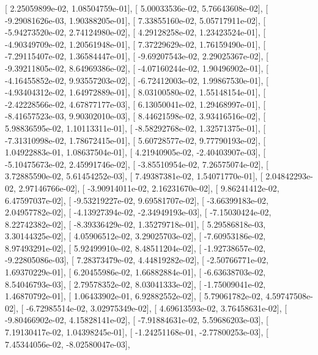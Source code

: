 \documentclass{article}
\begin{document}
       [  2.25059899e-02,   1.08504759e-01],
       [  5.00033536e-02,   5.76643608e-02],
       [ -9.29081626e-03,   1.90388205e-01],
       [  7.33855160e-02,   5.05717911e-02],
       [ -5.94273520e-02,   2.74124980e-02],
       [  4.29128258e-02,   1.23423524e-01],
       [ -4.90349709e-02,   1.20561948e-01],
       [  7.37229629e-02,   1.76159490e-01],
       [ -7.29115407e-02,   1.36584447e-01],
       [ -9.69207543e-02,   2.29025367e-02],
       [ -9.39211805e-02,   8.64969386e-02],
       [ -4.07160244e-02,   1.90496902e-01],
       [ -4.16455852e-02,   9.93557203e-02],
       [ -6.72412003e-02,   1.99867530e-01],
       [ -4.93404312e-02,   1.64972889e-01],
       [  8.03100580e-02,   1.55148154e-01],
       [ -2.42228566e-02,   4.67877177e-03],
       [  6.13050041e-02,   1.29468997e-01],
       [ -8.41657523e-03,   9.90302010e-03],
       [  8.44621598e-02,   3.93416516e-02],
       [  5.98836595e-02,   1.10113311e-01],
       [ -8.58292768e-02,   1.32571375e-01],
       [ -7.31310998e-02,   1.78672415e-01],
       [  5.60728577e-02,   9.77790193e-02],
       [  1.04922883e-01,   1.08637504e-01],
       [  4.21940905e-02,  -2.40403907e-03],
       [ -5.10475673e-02,   2.45991746e-02],
       [ -3.85510954e-02,   7.26575074e-02],
       [  3.72885590e-02,   5.61454252e-03],
       [  7.49387381e-02,   1.54071770e-01],
       [  2.04842293e-02,   2.97146766e-02],
       [ -3.90914011e-02,   2.16231670e-02],
       [  9.86241412e-02,   6.47597037e-02],
       [ -9.53219227e-02,   9.69581707e-02],
       [ -3.66399183e-02,   2.04957782e-02],
       [ -4.13927394e-02,  -2.34949193e-03],
       [ -7.15030424e-02,   8.22742382e-02],
       [ -8.39336429e-02,   1.35279718e-01],
       [  5.29586818e-03,   3.30144325e-02],
       [  4.05906512e-02,   3.29025703e-02],
       [ -7.60953186e-02,   8.97493291e-02],
       [  5.92499910e-02,   8.48511204e-02],
       [ -1.92738657e-02,  -9.22805086e-03],
       [  7.28373479e-02,   4.44819282e-02],
       [ -2.50766771e-02,   1.69370229e-01],
       [  6.20455986e-02,   1.66882884e-01],
       [ -6.63638703e-02,   8.54046793e-03],
       [  2.79578352e-02,   8.03041333e-02],
       [ -1.75009041e-02,   1.46870792e-01],
       [  1.06433902e-01,   6.92882552e-02],
       [  5.79061782e-02,   4.59747508e-02],
       [ -6.72985514e-02,   3.02975349e-02],
       [  4.69613593e-02,   3.76458631e-02],
       [ -9.80466902e-02,   4.15828141e-02],
       [ -7.91884631e-02,   5.59686203e-03],
       [  7.19130417e-02,   1.04398245e-01],
       [ -1.24251168e-01,  -2.77800253e-03],
       [  7.45344056e-02,  -8.02580047e-03],
\end{document}
